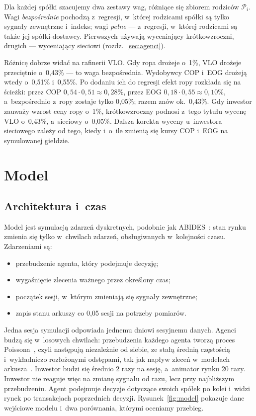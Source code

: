 \documentclass[11pt,a4paper]{article}
\begin{document}
Dla każdej spółki szacujemy dwa zestawy wag, różniące się zbiorem rodziców $\mathcal P_i$. Wagi
\emph{bezpośrednie} pochodzą z~regresji, w~której rodzicami spółki są tylko sygnały zewnętrzne i~indeks; wagi
\emph{pełne} --- z~regresji, w~której rodzicami są także jej spółki-dostawcy. Pierwszych używają wyceniający
krótkowzroczni, drugich --- wyceniający sieciowi (rozdz.~\ref{sec:agenci}). 

Różnicę dobrze widać na rafinerii VLO. Gdy ropa drożeje o~1\%, VLO drożeje przeciętnie o~0,43\% --- to waga
bezpośrednia. Wydobywcy COP i~EOG drożeją wtedy o~0,51\% i~0,55\%. Po dodaniu ich do regresji efekt ropy rozkłada
się na ścieżki: przez COP $0{,}54 \cdot 0{,}51 \approx 0{,}28\%$, przez EOG $0{,}18 \cdot 0{,}55 \approx 0{,}10\%$,
a~bezpośrednio z~ropy zostaje tylko 0,05\%; razem znów ok.~0,43\%. Gdy inwestor zauważy wzrost ceny ropy o~1\%,
krótkowzroczny podnosi z~tego tytułu wycenę VLO o~0,43\%, a~sieciowy o~0,05\%. Dalsza korekta wyceny
u~inwestora sieciowego zależy od tego, kiedy i~o~ile zmienią się kursy COP i~EOG na symulowanej giełdzie.

\section{Model}\label{sec:model}

\subsection{Architektura i~czas}
Model jest symulacją zdarzeń dyskretnych, podobnie jak ABIDES~\cite{abides}: stan rynku zmienia się tylko
w~chwilach zdarzeń, obsługiwanych w~kolejności czasu. Zdarzeniami są:
\begin{itemize}[label=--]
  \item przebudzenie agenta, który podejmuje decyzję;
  \item wygaśnięcie zlecenia ważnego przez określony czas;
  \item początek sesji, w~którym zmieniają się sygnały zewnętrzne;
  \item zapis stanu arkuszy co 0,05 sesji na potrzeby pomiarów.
\end{itemize}
Jedna
sesja symulacji odpowiada jednemu dniowi sesyjnemu danych. Agenci budzą się w~losowych chwilach: przebudzenia
każdego agenta tworzą proces Poissona~\cite{ross2019}, czyli następują niezależnie od siebie, ze stałą średnią
częstością i~wykładniczo rozłożonymi odstępami, tak jak napływ zleceń w~modelach arkusza~\cite{cont2010}.
Inwestor budzi się średnio 2 razy na sesję, a~animator rynku 20 razy. Inwestor nie reaguje więc na zmianę sygnału
od razu, lecz przy najbliższym przebudzeniu. Agent podejmuje decyzje dotyczące swoich spółek po kolei i~widzi rynek
po transakcjach poprzednich decyzji. Rysunek~\ref{fig:model} pokazuje dane wejściowe modelu i~dwa porównania, którymi oceniamy przebieg.
\end{document}
